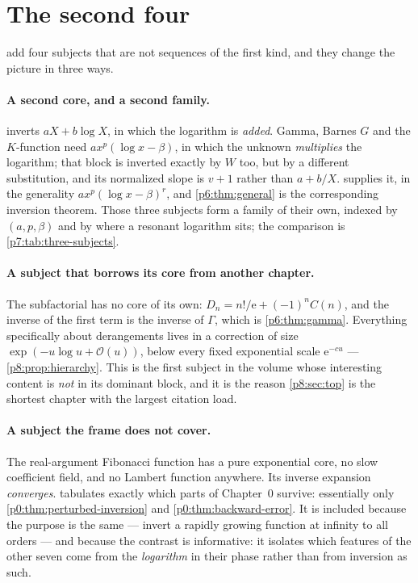 \documentclass[11pt,a4paper,oneside]{book}
\theoremstyle{plain}
\theoremstyle{definition}
\theoremstyle{remark}
\newcommand{\e}{\mathrm{e}}
\newcommand{\bigO}{\mathcal{O}}
\newcommand{\Wlam}{W}
\begin{document}
\section{The second four}
\label{p5:sec:second-four}

 add four subjects that are
not sequences of the first kind, and they change the picture in three ways.

\paragraph{A second core, and a second family.}
 inverts $aX+b\log X$, in which the logarithm is
\emph{added}.  Gamma, Barnes $G$ and the $K$-function need
$a x^{p}(\log x-\beta)$, in which the unknown \emph{multiplies} the logarithm;
that block is inverted exactly by $\Wlam$ too, but by a different
substitution, and its normalized slope is $v+1$ rather than $a+b/X$.
 supplies it, in the generality
$a x^{p}(\log x-\beta)^{r}$, and \cref{p6:thm:general} is the corresponding
inversion theorem.  Those three subjects form a family of their own, indexed
by $(a,p,\beta)$ and by where a resonant logarithm sits; the comparison is
\cref{p7:tab:three-subjects}.

\paragraph{A subject that borrows its core from another chapter.}
The subfactorial has no core of its own: $D_n=n!/\e+(-1)^{n}C(n)$, and the
inverse of the first term is the inverse of $\Gamma$, which is
\cref{p6:thm:gamma}.  Everything specifically about derangements lives in a
correction of size $\exp(-u\log u+\bigO(u))$, below every fixed exponential
scale $\e^{-cu}$ --- \cref{p8:prop:hierarchy}.  This is the first subject in
the volume whose interesting content is \emph{not} in its dominant block, and
it is the reason \cref{p8:sec:top} is the shortest chapter with the largest
citation load.

\paragraph{A subject the frame does not cover.}
The real-argument Fibonacci function has a pure exponential core, no slow
coefficient field, and no Lambert function anywhere.  Its inverse expansion
\emph{converges}.   tabulates exactly which parts of
Chapter~0 survive: essentially only
\cref{p0:thm:perturbed-inversion} and \cref{p0:thm:backward-error}.  It is
included because the purpose is the same --- invert a rapidly growing function
at infinity to all orders --- and because the contrast is informative: it
isolates which features of the other seven come from the \emph{logarithm} in
their phase rather than from inversion as such.
\end{document}
